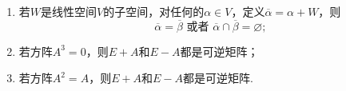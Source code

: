 \begin{enumerate}
\begin{enumerate}[label=(\arabic*)]
        \item 若$W$是线性空间$V$的子空间，对任何的$\alpha\in V$，定义$\overline{\alpha}=\alpha+W$，则
        \[\overline{\alpha}=\overline{\beta}\text{ 或者 }\overline{\alpha}\cap\overline{\beta}=\varnothing;\]

        \item 若方阵$A^3=0$，则$E+A$和$E-A$都是可逆矩阵；

        \item 若方阵$A^2=A$，则$E+A$和$E-A$都是可逆矩阵.
    \end{enumerate}
\end{enumerate}

\clearpage
